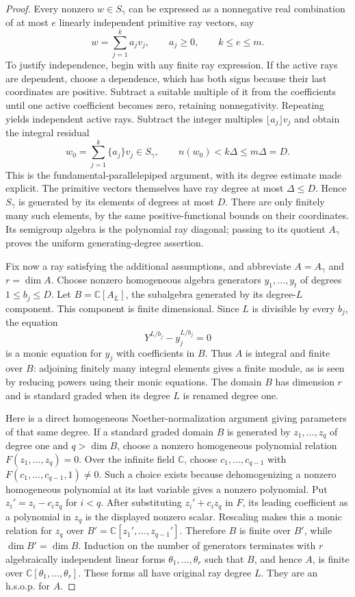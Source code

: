 \begin{proof}
Every nonzero $w\in S_\gamma$ can be expressed as a nonnegative real
combination of at most $e$ linearly independent primitive ray vectors,
say
\[
 w=\sum_{j=1}^k a_jv_j,\qquad a_j\ge0,\qquad k\le e\le m.
\]
To justify independence, begin with any finite ray expression.
If the active rays are dependent, choose a dependence, which has both
signs because their last coordinates are positive. Subtract a suitable
multiple of it from the coefficients until one active coefficient
becomes zero, retaining nonnegativity. Repeating yields independent
active rays.
Subtract the integer multiples $\lfloor a_j\rfloor v_j$ and obtain
the integral residual
\[
 w_0=\sum_{j=1}^k\{a_j\}v_j\in S_\gamma,
 \qquad n(w_0)<k\Delta\le m\Delta=D.
 \tag{P-F16e}
\]
This is the fundamental-parallelepiped argument, with its degree
estimate made explicit. The primitive vectors themselves have ray
degree at most $\Delta\le D$. Hence $S_\gamma$ is generated by its
elements of degrees at most $D$. There are only finitely many such
elements, by the same positive-functional bounds on their coordinates.
Its semigroup algebra is the polynomial ray diagonal; passing to its
quotient $A_\gamma$ proves the uniform generating-degree assertion.

Fix now a ray satisfying the additional assumptions, and abbreviate
$A=A_\gamma$ and $r=\dim A$. Choose nonzero homogeneous algebra
generators $y_1,\ldots,y_t$ of degrees $1\le b_j\le D$.
Let $B=\mathbb C[A_L]$, the subalgebra generated by its degree-$L$
component. This component is finite dimensional. Since $L$ is divisible
by every $b_j$, the equation
\[
 Y^{L/b_j}-y_j^{L/b_j}=0
\]
is a monic equation for $y_j$ with coefficients in $B$.
Thus $A$ is integral and finite over $B$: adjoining finitely many
integral elements gives a finite module, as is seen by reducing powers
using their monic equations. The domain $B$ has dimension $r$ and is
standard graded when its degree $L$ is renamed degree one.

Here is a direct homogeneous Noether-normalization argument giving
parameters of that same degree. If a standard graded domain $B$ is
generated by $z_1,\ldots,z_q$ of degree one and $q>\dim B$, choose a
nonzero homogeneous polynomial relation $F(z_1,\ldots,z_q)=0$.
Over the infinite field $\mathbb C$, choose $c_1,\ldots,c_{q-1}$ with
$F(c_1,\ldots,c_{q-1},1)\ne0$. Such a choice exists because
dehomogenizing a nonzero homogeneous polynomial at its last variable
gives a nonzero polynomial. Put $z_i'=z_i-c_i z_q$ for $i<q$.
After substituting $z_i'+c_i z_q$ in $F$, its leading coefficient
as a polynomial in $z_q$ is the displayed nonzero scalar.
Rescaling makes this a monic relation for $z_q$ over
$B'=\mathbb C[z_1',\ldots,z_{q-1}']$. Therefore $B$ is finite over
$B'$, while $\dim B'=\dim B$. Induction on the number of generators
terminates with $r$ algebraically independent linear forms
$\theta_1,\ldots,\theta_r$ such that $B$, and hence $A$, is finite
over $\mathbb C[\theta_1,\ldots,\theta_r]$. These forms all have
original ray degree $L$. They are an h.s.o.p. for $A$.


\end{proof}
